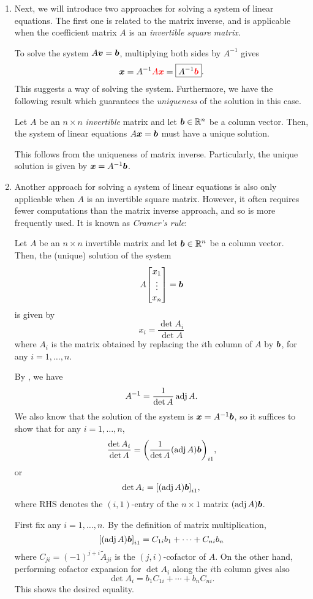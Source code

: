 \begin{enumerate}
\item \label{it:matrix-inv-solve-sle}
Next, we will introduce two approaches for solving a system of linear
equations. The first one is related to the matrix inverse, and is applicable
when the coefficient matrix \(A\) is an \emph{invertible square matrix}.

To solve the system \(A\vb*{v}=\vb*{b}\), multiplying both sides by
\(A^{-1}\) gives
\[
\vb*{x}=A^{-1}{\color{red}A\vb*{x}}=\boxed{A^{-1}{\color{red}\vb*{b}}}.
\]
This suggests a way of solving the system. Furthermore, we have the following
result which guarantees the \emph{uniqueness} of the solution in this case.

\begin{proposition}
\label{prp:inv-sle-unique}
Let \(A\) be an \(n\times n\) \emph{invertible} matrix and let \(\vb*{b}\in\mathbb{R}^n\) be a column
vector. Then, the system of linear equations \(A\vb*{x}=\vb*{b}\) must have a
unique solution.
\end{proposition}
\begin{pf}
This follows from the uniqueness of matrix inverse. Particularly, the unique
solution is given by \(\vb*{x}=A^{-1}\vb*{b}\).
\end{pf}

\item Another approach for solving a system of linear equations is also only
applicable when \(A\) is an invertible square matrix. However, it often
requires fewer computations than the matrix inverse approach, and so is more
frequently used. It is known as \emph{Cramer's rule}:
\begin{theorem}
\label{thm:cramer-rule}
Let \(A\) be an \(n\times n\) invertible matrix and let \(\vb*{b}\in\mathbb{R}^n\) be
a column vector. Then, the (unique) solution of the system
\[
A\mqty[x_1\\ \vdots\\ x_n]=\vect{b}
\]
is given by
\[
x_i=\frac{\det A_i}{\det A}
\]
where \(A_i\) is the matrix obtained by replacing the \(i\)th column of \(A\)
by \(\vb*{b}\), for any \(i=1,\dotsc,n\).
\end{theorem}
\begin{pf}
By , we have
\[
A^{-1}=\frac{1}{\det A}\operatorname{adj} A.
\]
We also know that the solution of the system is \(\vb*{x}=A^{-1}\vb*{b}\), so
it suffices to show that for any \(i=1,\dotsc,n\),
\[
\frac{\det A_i}{\det A}=\qty(\frac{1}{\det A}(\operatorname{adj} A)\vb*{b})_{i1},
\]
or
\[
\det A_i=\qty[(\operatorname{adj} A)\vb*{b}]_{i1},
\]
where RHS denotes the \((i,1)\)-entry of the \(n\times 1\) matrix
\((\operatorname{adj} A)\vb*{b}\).

First fix any \(i=1,\dotsc,n\). By the definition of matrix multiplication,
\[
\qty[(\operatorname{adj} A)\vb*{b}]_{i1}
=C_{1i}b_1+\dotsb+C_{ni}b_n
\]
where \(C_{ji}=(-1)^{j+i}\widetilde{A}_{ji}\) is the \((j,i)\)-cofactor of
\(A\). On the other hand, performing cofactor expansion for \(\det A_i\) along
the \(i\)th column gives also
\[
\det A_i=b_1C_{1i}+\dotsb+b_nC_{ni}.
\]
This shows the desired equality.
\end{pf}
\end{enumerate}

